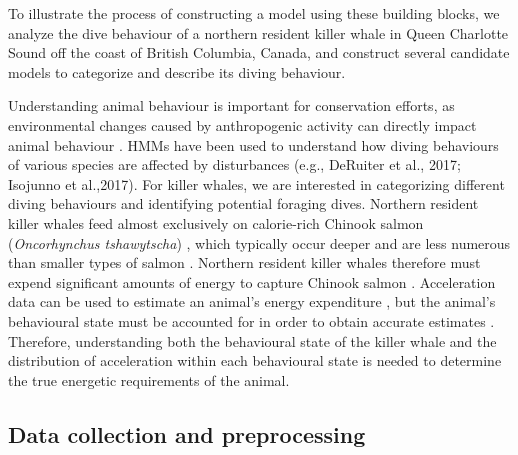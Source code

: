 

To illustrate the process of constructing a model using these building blocks, we analyze the dive behaviour of a northern resident killer whale in Queen Charlotte Sound off the coast of British Columbia, Canada, and construct several candidate models to categorize and describe its diving behaviour.

Understanding animal behaviour is important for conservation efforts, as environmental changes caused by anthropogenic activity can directly impact animal behaviour \citep{Sutherland:1998}. HMMs have been used to understand how diving behaviours of various species are affected by disturbances (e.g., DeRuiter et al., 2017; Isojunno et al.,2017)\nocite{DeRuiter:2017,Isojunno:2017}. For killer whales, we are interested in categorizing different diving behaviours and identifying potential foraging dives. Northern resident killer whales feed almost exclusively on calorie-rich Chinook salmon (\textit{Oncorhynchus tshawytscha}) \citep{Ford:2006}, which typically occur deeper and are less numerous than smaller types of salmon \citep{Ford:2009}. Northern resident killer whales therefore must expend significant amounts of energy to capture Chinook salmon \citep{Williams:2009,Noren:2011,Wright:2017}. 
Acceleration data can be used to estimate an animal's energy expenditure \citep{Green:2009,Wilson:2019}, but the animal's behavioural state must be accounted for in order to obtain accurate estimates \citep{Dot:2016}. Therefore, understanding both the behavioural state of the killer whale and the distribution of acceleration within each behavioural state is needed to determine the true energetic requirements of the animal.

\subsection{Data collection and preprocessing}

